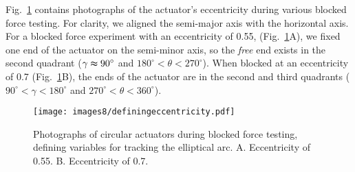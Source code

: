 Fig.~\ref{fig:comparingeccentricity} contains photographs of the actuator's eccentricity during various blocked force testing. For clarity, we aligned the semi-major axis with the horizontal axis. For a blocked force experiment with an eccentricity of 0.55, (Fig.~\ref{fig:comparingeccentricity}A), we fixed one end of the actuator on the semi-minor axis, so the \emph{free} end exists in the second quadrant ($\gamma\thickapprox90^\circ$ and $180^\circ<\theta<270^\circ$). When blocked at an eccentricity of 0.7 (Fig.~\ref{fig:comparingeccentricity}B), the ends of the actuator are in the second and third quadrants ($90^\circ<\gamma<180^\circ$ and $270^\circ<\theta<360^\circ$). \\

\begin{figure}[!ht]
    \centering
     \texttt{[image: images8/definingeccentricity.pdf]}
    \caption{Photographs of circular actuators during blocked force testing, defining variables for tracking the elliptical arc. A. Eccentricity of 0.55. B. Eccentricity of 0.7.}
    \label{fig:comparingeccentricity}
\end{figure}
